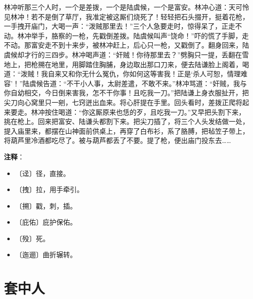 \documentclass[12pt,UTF-8,openany]{ctexbook}
\begin{document}
\begin{normalsize}
    林冲听那三个人时，一个是差拨，一个是陆虞候，一个是富安。林冲心道：天可怜见林冲！若不是倒了草厅，我准定被这厮们烧死了！轻轻把石头掇开，挺着花枪，一手拽开庙门，大喝一声：“泼贼那里去！”三个人急要走时，惊得呆了，正走不动。林冲举手，胳察的一枪，先戳倒差拨。陆虞候叫声“饶命！”吓的慌了手脚，走不动。那富安走不到十来步，被林冲赶上，后心只一枪，又戳倒了。翻身回来，陆虞候却才行的三四步。林冲喝声道：“奸贼！你待那里去？”劈胸只一提，丢翻在雪地上，把枪搠在地里，用脚踏住胸脯，身边取出那口刀来，便去陆谦脸上阁着，喝道：“泼贼！我自来又和你无什么冤仇，你如何这等害我！正是‘杀人可恕，情理难容’！”陆虞候告道：“不干小人事，太尉差遣，不敢不来。”林冲骂道：“奸贼，我与你自幼相交，今日倒来害我，怎不干你事！且吃我一刀。”把陆谦上身衣服扯开，把尖刀向心窝里只一剜，七窍迸出血来。将心肝提在手里。回头看时，差拨正爬将起来要走。林冲按住喝道：“你这厮原来也恁的歹，且吃我一刀。”又早把头割下来，挑在枪上。回来把富安、陆谦头都割下来。把尖刀插了，将三个人头发结做一处，提入庙里来，都摆在山神面前供桌上，再穿了白布衫，系了胳膊，把毡笠子带上，将葫芦里冷酒都吃尽了。被与葫芦都丢了不要。提了枪，便出庙门投东去……
    
\end{normalsize}


\newpage

\textbf{注释}：

\vspace{-1em}

\begin{itemize}
    \setlength\itemsep{-0.2em}
    \item 〔迳〕径，直接。
    \item 〔拽〕拉，用手牵引。
    \item 〔搠〕戳，刺，插。
    \item 〔庇佑〕庇护保佑。
    \item 〔殁〕死。
    \item 〔迤逦〕曲折辗转。
\end{itemize}

\chapter{套中人}
\end{document}
